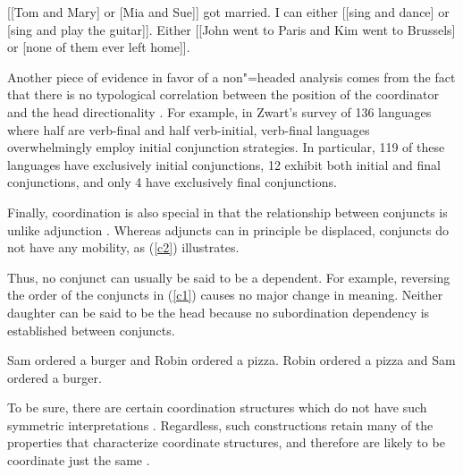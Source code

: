 {\begin{exe}
\ex
\begin{xlista}
\ex {}[[Tom and Mary] or [Mia and Sue]] got married.
\ex I can either [[sing and dance] or [sing and play the guitar]].
\ex Either [[John went to Paris and Kim went to Brussels] or
[none of them ever left home]].
\end{xlista}
\end{exe}

Another piece of evidence in favor of a non"=headed analysis comes from the fact that there is no typological correlation between the position of the coordinator and the head directionality \citep{zwart}. For example, in Zwart's  survey of 136 languages where half are verb-final and half
verb-initial,  verb-final languages overwhelmingly employ initial conjunction strategies.
In particular, 119 of these languages have exclusively initial conjunctions, 12 exhibit both initial
and final conjunctions, and only 4 have exclusively final conjunctions. 


Finally, coordination is also special in that the relationship between conjuncts is unlike
adjunction \citep[--160]{levinepostal}.
Whereas adjuncts can in principle be displaced, conjuncts do not have any mobility, as (\ref{c2}) illustrates.

\begin{exe}
\ex
\begin{xlista}
\end{xlista}\label{c2}
\end{exe}


\noindent
Thus, no conjunct can usually be said to be a dependent. For example,  reversing the order of the conjuncts in (\ref{c1}) causes no major change in meaning. Neither daughter can be said to be the head because no subordination dependency is established between conjuncts.

\begin{exe}
\ex
\begin{xlista}
\ex Sam ordered a burger and Robin ordered a pizza.
\ex Robin ordered a pizza and Sam ordered a burger.
\end{xlista}\label{c1}
\end{exe}

\noindent
To be sure, there are certain coordination structures which do not have such symmetric 
interpretations \citep{goldsmith,lakoff86,levinprince86}.
Regardless, such constructions retain many of the properties that characterize coordinate structures, and therefore are likely to be
coordinate just the same \citep[Chapter~5]{kehler}.

}
